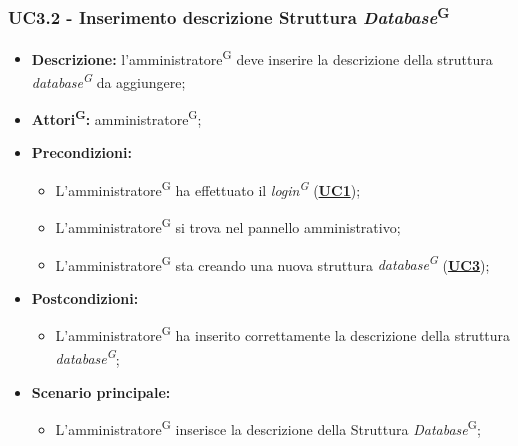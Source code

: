 \subsubsection{UC3.2 - Inserimento descrizione Struttura \textit{Database}\textsuperscript{G}}
\label{sec:UC3.2}
\begin{itemize}
	\item \textbf{Descrizione:} l’amministratore\textsuperscript{G} deve inserire la descrizione della struttura  \textit{database\textsuperscript{G}} da aggiungere;
	\item \textbf{Attori\textsuperscript{G}:} amministratore\textsuperscript{G};
	\item \textbf{Precondizioni:} 
	\begin{itemize}
		\item L’amministratore\textsuperscript{G} ha effettuato il \textit{login\textsuperscript{G}} (\hyperref[sec:UC1]{\textbf{UC1}});
		\item L’amministratore\textsuperscript{G} si trova nel pannello amministrativo;
		\item L’amministratore\textsuperscript{G} sta creando una nuova struttura \textit{database\textsuperscript{G}} (\hyperref[sec:UC3]{\textbf{UC3}});
	\end{itemize}
	\item \textbf{Postcondizioni:} 
	\begin{itemize}
		\item L'amministratore\textsuperscript{G} ha inserito correttamente la descrizione della struttura  \textit{database\textsuperscript{G}};
	\end{itemize}
	\item \textbf{Scenario principale:} 
	\begin{itemize}
		\item L’amministratore\textsuperscript{G} inserisce la descrizione della Struttura \textit{Database}\textsuperscript{G};
	\end{itemize}
\end{itemize}

